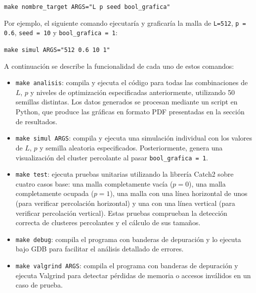 \documentclass[%
 reprint,
 amsmath,amssymb,
 aps,
]{revtex4-2}
\begin{document}
\begin{center}
    \texttt{make nombre\_target ARGS="L p seed bool\_grafica"}
\end{center}


Por ejemplo, el siguiente comando ejecutaría y graficaría la malla de \texttt{L=512}, \texttt{p = 0.6}, \texttt{seed = 10} y \texttt{bool\_grafica = 1}:

\begin{center}
    \texttt{make simul ARGS="512 0.6 10 1"}
\end{center}

A continuación se describe la funcionalidad de cada uno de estos comandos:

\begin{itemize}
    \item \texttt{make analisis}: compila y ejecuta el código para todas las combinaciones de \( L \), \( p \) y niveles de optimización especificadas anteriormente, utilizando 50 semillas distintas. Los datos generados se procesan mediante un script en Python, que produce las gráficas en formato PDF presentadas en la sección de resultados.

    \item \texttt{make simul ARGS}: compila y ejecuta una simulación individual con los valores de \( L \), \( p \) y semilla aleatoria especificados. Posteriormente, genera una visualización del cluster percolante al pasar \texttt{bool\_grafica = 1}.
    
    \item \texttt{make test}: ejecuta pruebas unitarias utilizando la librería Catch2\cite{catch2} sobre cuatro casos base: una malla completamente vacía (\( p = 0 \)), una malla completamente ocupada (\( p = 1 \)), una malla con una línea horizontal de unos (para verificar percolación horizontal) y una con una línea vertical (para verificar percolación vertical). Estas pruebas comprueban la detección correcta de clusteres percolantes y el cálculo de sus tamaños.
    
    \item \texttt{make debug}: compila el programa con banderas de depuración y lo ejecuta bajo GDB\cite{GDB} para facilitar el análisis detallado de errores.
    
    \item \texttt{make valgrind ARGS}: compila el programa con banderas de depuración y ejecuta Valgrind\cite{Valgrind} para detectar pérdidas de memoria o accesos inválidos en un caso de prueba.
    

\end{itemize}
\end{document}
